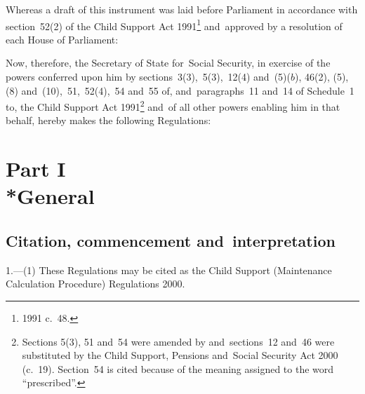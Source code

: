 \documentclass[12pt,a4paper]{article}
\title{\regstitle}
\author{S.I.~2001 No.~157}
\date{Made
18th January 2001\\
Coming into force
in accordance with regulation~1(5)
}
\begin{document}
\maketitle


\medskip

\noindent
Whereas a draft of this instrument was laid before Parliament in accordance with section~52(2) of the Child Support Act 1991\footnote{1991 c.\ 48.} and~approved by a resolution of each House of Parliament:

Now, therefore, the Secretary of State for~Social Security, in exercise of the powers conferred upon him by sections~3(3),~5(3),~12(4) and~(5)($b$), 46(2), (5), (8) and~(10),~51,~52(4),~54 and~55 of, and~paragraphs~11 and~14 of Schedule~1 to, the Child Support Act 1991\footnote{Sections 5(3), 51 and~54 were amended by and~sections~12 and~46 were substituted by the Child Support, Pensions and~Social Security Act 2000 (c.\ 19). Section~54 is cited because of the meaning assigned to the word “prescribed”.} and~of all other powers enabling him in that behalf, hereby makes the following Regulations: 

{\sloppy

\tableofcontents

}

\bigskip

\setcounter{secnumdepth}{-2}

\section[Part I --- General]{Part I\\*General}

\renewcommand\parthead{--- Part I}

\subsection[1. Citation, commencement and~interpretation]{Citation, commencement and~interpretation}

1.---(1)  These Regulations may be cited as the Child Support (Maintenance Calculation Procedure) Regulations 2000.
\end{document}
